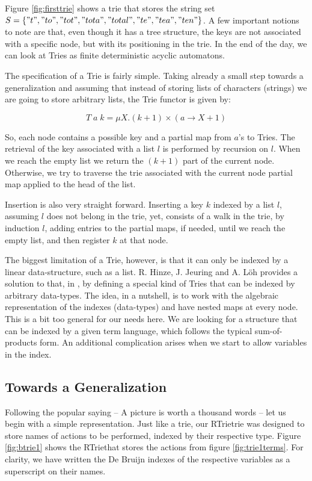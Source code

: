Figure \ref{fig:firsttrie} shows a trie that stores the string set 
$S = \{ "t" , "to" , "tot" , "tota" , "total" , "te" , "tea" , "ten" \}$.
A few important notions to note are that, even though it has a tree structure, the keys are
not associated with a specific node, but with its positioning in the trie.
In the end of the day, we can look at Tries as finite deterministic acyclic automatons.

The specification of a Trie is fairly simple. Taking already a small step towards a generalization
and assuming that instead of storing lists of characters (strings) we are going to store arbitrary
lists, the Trie functor is given by:

\[
  T\;a\;k = \mu X . (k + 1) \times (a \rightarrow X + 1)
\]

So, each node contains a possible key and a partial map from $a$'s to Tries. The retrieval of
the key associated with a list $l$ is performed by recursion on $l$. When we reach the empty list
we return the $(k+1)$ part of the current node. Otherwise, we try to traverse the trie associated with the
current node partial map applied to the head of the list. 

Insertion is also very straight forward. Inserting a key $k$ indexed by a list $l$, assuming $l$ does not belong
in the trie, yet, consists of a walk in the trie, by induction $l$, adding entries to the partial maps, if needed,
until we reach the empty list, and then register $k$ at that node.

The biggest limitation of a Trie, however, is that it can only be indexed by a linear data-structure, 
such as a list. R. Hinze, J. Jeuring and A. L\"{o}h provides a solution to that, in \cite{Hinze04}, 
by defining a special kind of Tries that can be indexed by arbitrary data-types. The idea, in a nutshell,
is to work with the algebraic representation of the indexes (data-types) and have nested maps at every node.
This is a bit too general for our needs here. We are looking for a structure that can be indexed
by a given term language, which follows the typical sum-of-products form. An additional complication
arises when we start to allow variables in the index.

\subsection{Towards a Generalization}

\newcommand{\mytrie}{RTrie}

Following the popular saying -- A picture is worth a thousand words -- let us begin
with a simple representation. Just like a trie, our \mytrie trie was designed to
store names of actions to be performed, indexed by their respective type. Figure 
\ref{fig:btrie1} shows the \mytrie that stores the actions from figure \ref{fig:trie1terms}.
For clarity, we have written the De Bruijn indexes of the respective variables as a superscript on
their names.

